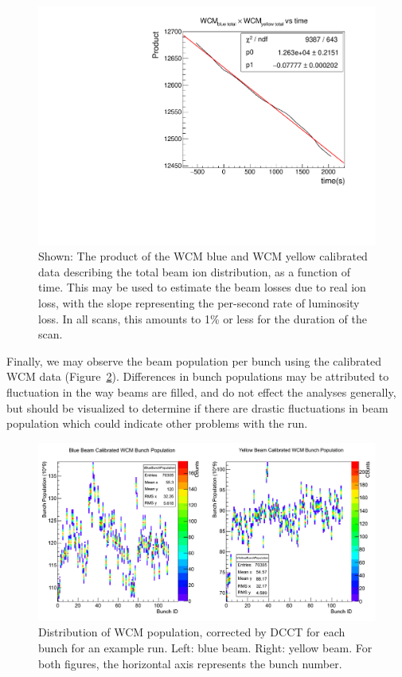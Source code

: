 \begin{figure}
  \centering
  \includegraphics[width=\linewidth]{./figures/wcm_rate_loss.pdf}
  \caption{
    Shown: The product of the WCM blue and WCM yellow calibrated data describing
    the total beam ion distribution, as a function of time. This may be used to
    estimate the beam losses due to real ion loss, with the slope representing
    the per-second rate of luminosity loss. In all scans, this amounts to 1\% or
    less for the duration of the scan.
  }
  \label{fig:wcm_rate_loss}
\end{figure}

Finally, we may observe the beam population per bunch using the calibrated WCM
data (Figure~\ref{fig:bunch_population_example}). Differences in bunch
populations may be attributed to fluctuation in the way beams are filled, and do
not effect the analyses generally, but should be visualized to determine if
there are drastic fluctuations in beam population which could indicate other
problems with the run.

\begin{figure}
  \centering
  \includegraphics[width=\linewidth]{./figures/359711_bunch_population.png}
  \caption{
    Distribution of WCM population, corrected by DCCT for each bunch for an
    example run. Left: blue beam. Right: yellow beam. For both figures, the
    horizontal axis represents the bunch number.
  }
  \label{fig:bunch_population_example}
\end{figure}

